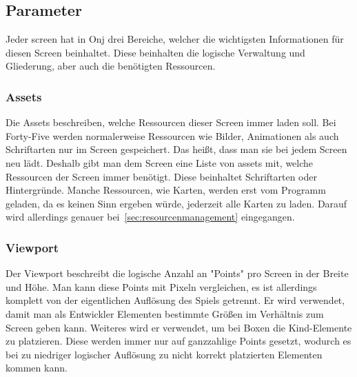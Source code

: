 \renewcommand{\kapitelautor}{Autor: Felix Zwickelstorfer}
\subsection{Parameter}\label{subsec:parameter}
\renewcommand{\kapitelautor}{Autor: Felix Zwickelstorfer}

Jeder screen hat in Onj drei Bereiche, welcher die wichtigsten Informationen für diesen Screen beinhaltet.
Diese beinhalten die logische Verwaltung und Gliederung, aber auch die benötigten Ressourcen.


\renewcommand{\kapitelautor}{Autor: Felix Zwickelstorfer}
\subsubsection{Assets}\label{subsubsec:assets}
\renewcommand{\kapitelautor}{Autor: Felix Zwickelstorfer}
Die Assets beschreiben, welche Ressourcen dieser Screen immer laden soll.
Bei Forty-Five werden normalerweise Ressourcen wie Bilder, Animationen als auch Schriftarten nur im Screen gespeichert.
Das heißt, dass man sie bei jedem Screen neu lädt.
Deshalb gibt man dem Screen eine Liste von assets mit, welche Ressourcen der Screen immer benötigt.
Diese beinhaltet \zB Schriftarten oder Hintergründe.
Manche Ressourcen, wie \zB Karten, werden erst vom Programm geladen, da es keinen Sinn ergeben würde, jederzeit alle Karten zu laden.
Darauf wird allerdings genauer bei~\ref{sec:resourcenmanagement} eingegangen.

\renewcommand{\kapitelautor}{Autor: Felix Zwickelstorfer}
\subsubsection{Viewport}\label{subsubsec:viewport}
\renewcommand{\kapitelautor}{Autor: Felix Zwickelstorfer}
Der Viewport beschreibt die logische Anzahl an "Points" pro Screen in der Breite und Höhe.
Man kann diese Points mit Pixeln vergleichen, es ist allerdings komplett von der eigentlichen Auflösung des Spiels getrennt.
Er wird verwendet, damit man als Entwickler Elementen bestimmte Größen im Verhältnis zum Screen geben kann.
Weiteres wird er verwendet, um bei Boxen die Kind-Elemente zu platzieren.
Diese werden immer nur auf ganzzahlige Points gesetzt, wodurch es bei zu niedriger logischer Auflösung zu nicht korrekt platzierten Elementen kommen kann.


\renewcommand{\kapitelautor}{Autor: Felix Zwickelstorfer}
